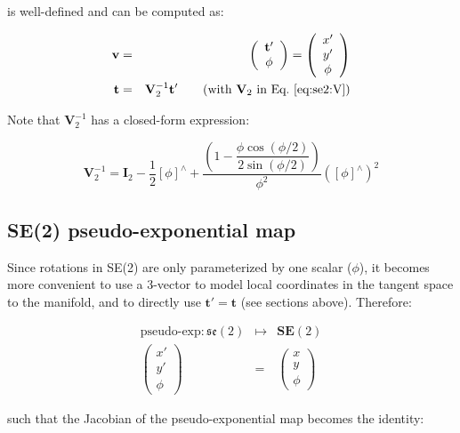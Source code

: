 \documentclass[a4paper,11pt]{report}
\newcommand{\hatop}[1]{#1^\wedge}
\begin{document}
\noindent is well-defined and can be computed as:

\begin{eqnarray}
\mathbf{v} &=&
\left(
\begin{array}{c}
 \mathbf{t}' \\ \phi
\end{array}
\right)
=
\left(
\begin{array}{c}
 x'\\y' \\ \phi
\end{array}
\right)
\nonumber \\
\mathbf{t} &=& \mathbf{V}_2^{-1} \mathbf{t}' \quad \quad \text{(with $\mathbf{V}_2$ in Eq.~\ref{eq:se2:V})}
\end{eqnarray}

Note that $\mathbf{V}_2^{-1}$ has a closed-form expression:

\begin{equation}
\mathbf{V}_2^{-1} = \mathbf{I}_2 
- \dfrac{1}{2} \hatop{[\phi]} + 
\dfrac{\left(
 1 - \dfrac{ \phi \cos(\phi/2)}{2 \sin(\phi / 2)}
\right) 
}{\phi^2}  (\hatop{[\phi]})^2
\end{equation}


\subsection{SE(2) pseudo-exponential map}
\label{sect:se2.ps-exp}

Since rotations in SE(2) are only parameterized by one scalar ($\phi$), 
it becomes more convenient to use a 3-vector to model local coordinates 
in the tangent space to the manifold, and to directly use $\mathbf{t}'=\mathbf{t}$
(see sections above). 
Therefore: 

\begin{eqnarray}
\label{eq:se2.pseudo-exp}
  \text{pseudo-exp}: \mathfrak{se}(2) &\mapsto& \mathbf{SE}(2) \\ 
  \left( \begin{array}{c} x' \\ y' \\ \phi \end{array} \right)
  &=&
  \left( \begin{array}{c} x \\ y \\ \phi \end{array} \right)
\end{eqnarray}

\noindent such that the Jacobian of the pseudo-exponential map 
becomes the identity:
\end{document}
